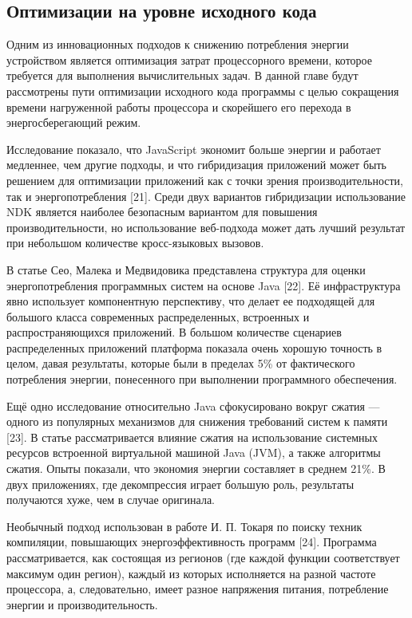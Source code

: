 \documentclass[a4paper,14pt]{extarticle} %
\begin{document}
	\subsection{Оптимизации на уровне исходного кода}

	Одним из инновационных подходов к снижению потребления энергии устройством является оптимизация затрат процессорного времени, которое требуется для выполнения вычислительных задач. В данной главе будут рассмотрены пути оптимизации исходного кода программы с целью сокращения времени нагруженной работы процессора и скорейшего его перехода в энергосберегающий режим.
	
	Исследование показало, что JavaScript экономит больше энергии и работает медленнее, чем другие подходы, и что гибридизация приложений может быть решением для оптимизации приложений как с точки зрения производительности, так и энергопотребления [21]. Среди двух вариантов гибридизации использование NDK является наиболее безопасным вариантом для повышения производительности, но использование веб-подхода может дать лучший результат при небольшом количестве кросс-языковых вызовов.
	
	В статье Сео, Малека и Медвидовика представлена структура для оценки энергопотребления программных систем на основе Java [22]. Её инфраструктура явно использует компонентную перспективу, что делает ее подходящей для большого класса современных распределенных, встроенных и распространяющихся приложений. В большом количестве сценариев распределенных приложений платформа показала очень хорошую точность в целом, давая результаты, которые были в пределах 5\% от фактического потребления энергии, понесенного при выполнении программного обеспечения. 
	
	Ещё одно исследование относительно Java сфокусировано вокруг сжатия — одного из популярных механизмов для снижения требований систем к памяти [23]. В статье рассматривается влияние сжатия на использование системных ресурсов встроенной виртуальной машиной Java (JVM), а также алгоритмы сжатия. Опыты показали, что экономия энергии составляет в среднем 21\%. В двух приложениях, где декомпрессия играет большую роль, результаты получаются хуже, чем в случае оригинала.
	
	Необычный подход использован в работе И. П. Токаря по поиску техник компиляции, повышающих энергоэффективность программ [24]. Программа рассматривается, как состоящая из регионов (где каждой функции соответствует максимум один регион), каждый из которых исполняется на разной частоте процессора, а, следовательно, имеет разное напряжения питания, потребление энергии и производительность.
	
\end{document}
